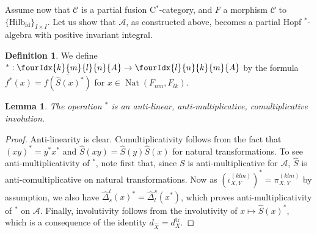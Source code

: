 \documentclass[10pt]{article}
\DeclareMathOperator{\fin}{\mathrm{fd}}
\DeclareMathOperator{\Nat}{\mathrm{Nat}}
\DeclareMathOperator{\tr}{\mathrm{tr}}
\newcommand{\CatCC}{\mathscr{C}}
\newcommand{\Hilb}{\mathrm{Hilb}}
\newcommand{\Gr}[5]{\fourIdx{#2}{#4}{#3}{#5}{#1}}%
\newtheorem{Lem}[Theorem]{Lemma}
\theoremstyle{definition}
\newtheorem{Def}[Theorem]{Definition}
\numberwithin{equation}{section}
\begin{document}
Assume now that $\CatCC$ is a partial fusion C$^*$-category, and $F$ a morphism $\CatCC$ to $\{\Hilb_{\fin}\}_{I\times I}$. Let us show that $\mathscr{A}$, as constructed above, becomes a partial Hopf $^*$-algebra with positive invariant integral.

\begin{Def} We define $^*: \Gr{A}{k}{l}{m}{n}\rightarrow \Gr{A}{l}{k}{n}{m}$ by the formula $f^*(x) = \overline{f(\hat{S}(x)^*)}$ for $x\in \Nat(F_{nm},F_{lk}).$
\end{Def}

\begin{Lem} The operation $^*$ is an anti-linear, anti-multiplicative, comultiplicative involution.
\end{Lem}

\begin{proof} Anti-linearity is clear. Comultiplicativity follows from the fact that $(xy)^* = y^*x^*$ and $\hat{S}(xy) = \hat{S}(y)\hat{S}(x)$ for natural transformations. To see anti-multiplicativity of $^*$, note first that, since $S$ is anti-multiplicative for $\mathscr{A}$, $\hat{S}$ is anti-comultiplicative on natural transformations. Now as $(\iota_{X,Y}^{(klm)})^* = \pi_{X,Y}^{(klm)}$ by assumption, we also have $\hat{\Delta}^l_s(x)^* = \hat{\Delta}^s_l(x^*)$, which proves anti-multiplicativity of $^*$ on $\mathscr{A}$.  Finally, involutivity follows from the involutivity of $x\mapsto \hat{S}(x)^*$, which is a consequence of the identity $d_{\hat{X}} = d_X^{\tr}$. 
\end{proof}
\end{document}
